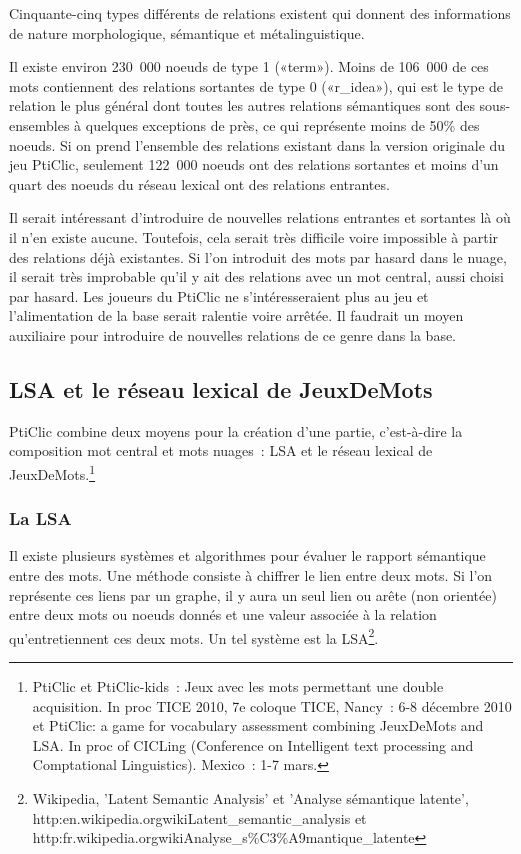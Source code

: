 \documentclass[a4paper,11pt,french]{article}
\begin{document}
Cinquante-cinq types différents de relations existent qui donnent des informations de nature morphologique, sémantique et métalinguistique. 

Il existe environ 230~000 noeuds de type 1 («term»). Moins de 106~000 de ces mots contiennent des relations sortantes de type 0 («r\_idea»), qui est le type de relation le plus général dont toutes les autres relations sémantiques sont des sous-ensembles à quelques exceptions de près, ce qui représente moins de 50\% des noeuds. Si on prend l'ensemble des relations existant dans la version originale du jeu PtiClic, seulement 122~000 noeuds ont des relations sortantes et moins d'un quart des noeuds du réseau lexical ont des relations entrantes. 

Il serait intéressant d'introduire de nouvelles relations entrantes et sortantes là où il n'en existe aucune. Toutefois, cela serait très difficile voire impossible à partir des relations déjà existantes. Si l'on introduit des mots par hasard dans le nuage, il serait très improbable qu'il y ait des relations avec un mot central, aussi choisi par hasard. Les joueurs du PtiClic ne s'intéresseraient plus au jeu et l'alimentation de la base serait ralentie voire arrêtée. Il faudrait un moyen auxiliaire pour introduire de nouvelles relations de ce genre dans la base.  

\subsection{LSA et le réseau lexical de JeuxDeMots}

PtiClic combine deux moyens pour la création d'une partie, c'est-à-dire la composition mot central et mots nuages~: LSA et le réseau lexical de JeuxDeMots.\footnote{PtiClic et PtiClic-kids~: Jeux avec les mots permettant une double acquisition. In proc TICE 2010, 7e coloque TICE, Nancy~: 6-8 décembre 2010 et PtiClic: a game for vocabulary assessment combining JeuxDeMots and LSA. In proc of CICLing (Conference on Intelligent text processing and Comptational Linguistics). Mexico~: 1-7 mars.}


\subsubsection{La LSA}

Il existe plusieurs systèmes et algorithmes pour évaluer le rapport sémantique entre des mots. Une méthode consiste à chiffrer le lien entre deux mots. Si l'on représente ces liens par un graphe, il y aura un seul lien ou arête (non orientée) entre deux mots ou noeuds donnés et une valeur associée à la relation qu'entretiennent ces deux mots. Un tel système est la LSA\footnote{Wikipedia, 'Latent Semantic Analysis' et 'Analyse sémantique latente', http:\/\/en.wikipedia.org\/wiki\/Latent\_semantic\_analysis et http:\/\/fr.wikipedia.org\/wiki\/Analyse\_s\%C3\%A9mantique\_latente}. 
\end{document}
